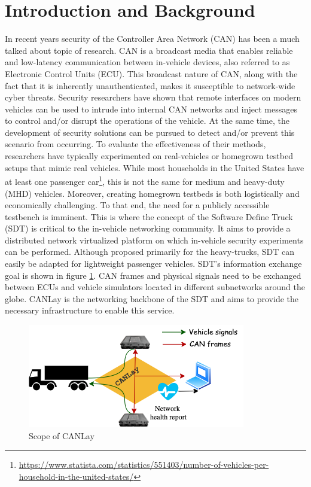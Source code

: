 \documentclass[letterpaper,twocolumn,12pt]{article}
\begin{document}
\section{Introduction and Background}
In recent years security of the Controller Area Network (CAN) has been a much talked about topic of research. CAN is a broadcast media that enables reliable and low-latency communication between in-vehicle devices, also referred to as Electronic Control Units (ECU). This broadcast nature of CAN, along with the fact that it is inherently unauthenticated, makes it susceptible to network-wide cyber threats. 
Security researchers have shown \cite{checkoway_comprehensive_2011, mukherjee_practical_2016,burakova_truck_2016} that remote interfaces on modern vehicles can be used to intrude into internal CAN networks and inject messages to control and/or disrupt the operations of the vehicle. At the same time, the development of security solutions can be pursued to detect and/or prevent this scenario from occurring.
To evaluate the effectiveness of their methods, researchers have typically experimented on real-vehicles or homegrown testbed setups that mimic real vehicles. 
While most households in the United States have at least one passenger car\footnote{\url{https://www.statista.com/statistics/551403/number-of-vehicles-per-household-in-the-united-states/}}, this is not the same for medium and heavy-duty (MHD) vehicles. 
Moreover, creating homegrown testbeds is both logistically and economically challenging. To that end, the need for a publicly accessible testbench is imminent. This is where the concept of the Software Define Truck (SDT) \cite{mukherjee_towards_2021} is critical to the in-vehicle networking community. It aims to provide a distributed network virtualized platform on which in-vehicle security experiments can be performed. Although proposed primarily for the heavy-trucks, SDT can easily be adapted for lightweight passenger vehicles. SDT's information exchange goal is shown in figure \ref{fig:goal}. CAN frames and physical signals need to be exchanged between ECUs and vehicle simulators located in different subnetworks around the globe. CANLay is the networking backbone of the SDT and aims to provide the necessary infrastructure to enable this service.

\begin{figure}[t!]
    \centering
    \includegraphics[width=\linewidth]{images/design_goal.drawio.png}
    \caption{Scope of CANLay}
    \label{fig:goal}
\end{figure}
\end{document}
